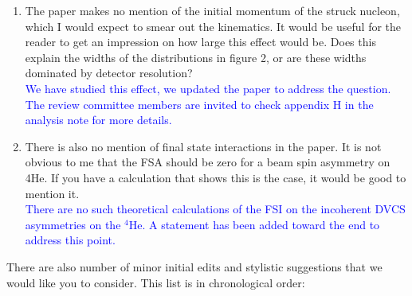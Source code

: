 \documentclass[a4paper,11pt,twoside]{article}
\begin{document}
\begin{enumerate}
\item  The paper makes no mention of the initial momentum of the struck 
   nucleon, which I would expect to smear out the kinematics. It would be 
      useful for the reader to get an impression on how large this effect would 
      be. Does this explain the widths of the distributions in figure 2, or are 
      these widths dominated by detector resolution?\\
   \textcolor{blue}{We have studied this effect, we updated the paper to
      address the question. The review 
      committee members are invited to check appendix H in the analysis note 
      for more details.}

\item  There is also no mention of final state interactions in the paper. It is 
   not obvious to me that the FSA should be zero for a beam spin asymmetry on 
      4He. If you have a calculation that shows this is the case, it would be 
      good to mention it.\\
   \textcolor{blue}{There are no such theoretical calculations of the FSI on 
      the incoherent DVCS asymmetries on the $^4$He. A statement has been added
      toward the end to address this point.}

\end{enumerate}


\newpage
\newpage
\newpage
\newpage

There are also number of minor initial edits and stylistic suggestions that we 
would like you to consider. This list is in chronological order:
\end{document}
